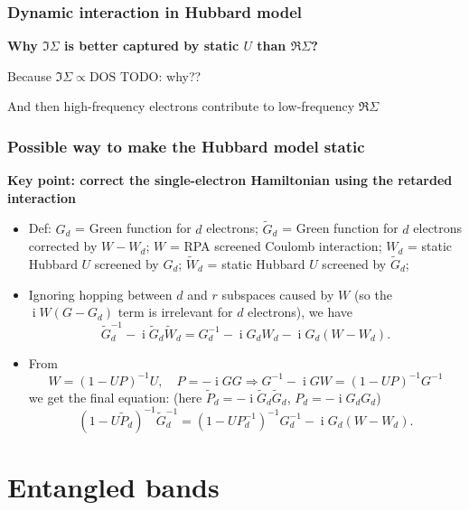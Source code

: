 \documentclass{beamer}
\DeclareMathOperator{\ii}{i}
\begin{document}
\begin{frame}
\frametitle{Dynamic interaction in Hubbard model}

\textbf{Why $\Im \Sigma$ is better captured by static $U$ than $\Re \Sigma$?}

Because $\Im \Sigma \propto \text{DOS}$ TODO: why??

And then high-frequency electrons contribute to low-frequency $\Re \Sigma$ 

\end{frame}

\begin{frame}
\frametitle{Possible way to make the Hubbard model static}

\textbf{Key point: correct the single-electron Hamiltonian using the retarded interaction}

\begin{itemize}
    \item Def: $G_d$ = Green function for $d$ electrons; 
        $\tilde{G}_d$ = Green function for $d$ electrons corrected by $W - W_d$; 
        $W$ = RPA screened Coulomb interaction; 
        $W_d$ = static Hubbard $U$ screened by $G_d$; 
        $\tilde{W}_d$ = static Hubbard $U$ screened by $\tilde{G}_d$;
    \item Ignoring hopping between $d$ and $r$ subspaces caused by $W$
        (so the $\ii W (G - G_d)$ term is irrelevant for $d$ electrons), we have 
        \begin{equation}
            \tilde{G}_d^{-1} - \ii \tilde{G}_d \tilde{W}_d = 
            G_d^{-1} - \ii G_d W_d - \ii G_d (W - W_d).
        \end{equation}
    \item  From
    \begin{equation}
        W = (1 - UP)^{-1} U, \quad P = - \ii G G \Rightarrow
        G^{-1} - \ii GW = (1 - UP)^{-1} G^{-1} 
    \end{equation} 
    we get the final equation: 
    (here $\tilde{P}_d = - \ii \tilde{G}_d \tilde{G}_d$, 
    $P_d = - \ii G_d G_d$)
    \begin{equation}
            (1 - U \tilde{P}_d)^{-1} \tilde{G}_d^{-1}
            = (1 - U P_d^{-1})^{-1} G_d^{-1}
            - \ii G_d  (W -W_d).
        \end{equation}
\end{itemize}

\end{frame}

\section{Entangled bands}
\end{document}
